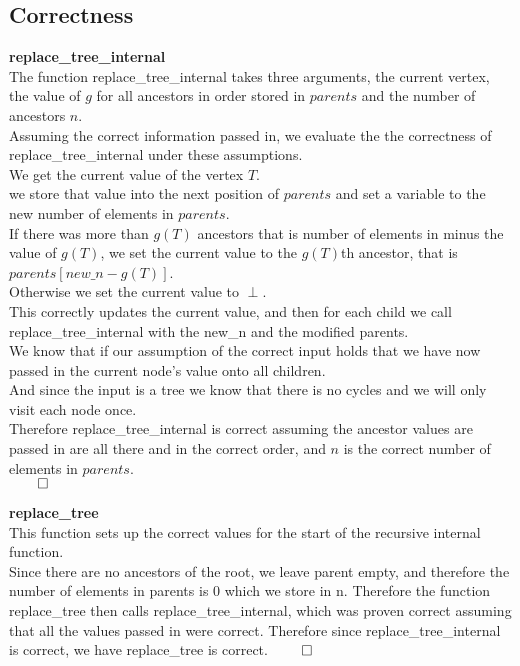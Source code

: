 \documentclass{article}
\begin{document}
    \subsection{Correctness}
      \textbf{replace\_tree\_internal}\\
      The function replace\_tree\_internal takes three arguments, the current vertex, the value of $g$ for all ancestors in order stored in $parents$ and the number of ancestors $n$.\\
      Assuming the correct information passed in, we evaluate the the correctness of replace\_tree\_internal under these assumptions.\\
      We get the current value of the vertex $T$.\\
      we store that value into the next position of $parents$ and set a variable to the new number of elements in $parents$.\\
      If there was more than $g(T)$ ancestors that is number of elements in minus the value of $g(T)$, we set the current value to the $g(T)$th ancestor, that is $parents[new\_n - g(T)]$.\\
      Otherwise we set the current value to $\perp$.\\
      This correctly updates the current value, and then for each child we call replace\_tree\_internal with the new\_n and the modified parents.\\
      We know that if our assumption of the correct input holds that we have now passed in the current node's value onto all children.\\
      And since the input is a tree we know that there is no cycles and we will only visit each node once.\\
      Therefore replace\_tree\_internal is correct assuming the ancestor values are passed in are all there and in the correct order, and $n$ is the correct number of elements in $parents$.\\ $\qed$

      \textbf{replace\_tree}\\
      This function sets up the correct values for the start of the recursive internal function.\\
      Since there are no ancestors of the root, we leave parent empty, and therefore the number of elements in parents is 0 which we store in n. 
      Therefore the function replace\_tree then calls replace\_tree\_internal, which was proven correct assuming that all the values passed in were correct.
      Therefore since replace\_tree\_internal is correct, we have replace\_tree is correct. $\qed$\\
\end{document}
